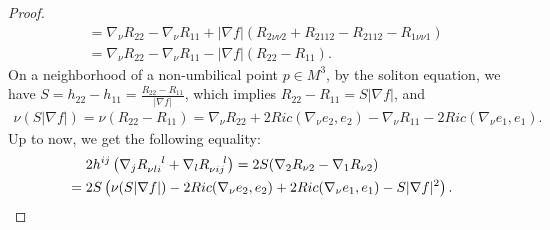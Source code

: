 \documentclass[12pt,a4paper]{amsart}
\begin{document}
\begin{proof}
\begin{align*}
&=\nabla_\nu R_{22}-\nabla_\nu R_{11}+|\nabla f|(R_{2\nu \nu 2}+R_{2112}-R_{2112}-R_{1\nu \nu 1}) \\
&=\nabla_\nu R_{22}-\nabla_\nu R_{11}-|\nabla f|(R_{22}-R_{11}).
\end{align*}
On a neighborhood of a non-umbilical point $p\in M^3$, by the soliton equation, we have $S=h_{22}-h_{11}=\frac{R_{22}-R_{11}}{|\nabla f|}$,
which implies $R_{22}-R_{11}=S|\nabla f|$, and
\begin{align*}
\nu(S|\nabla f|)=\nu(R_{22}-R_{11})
=\nabla_{\nu}R_{22}+2Ric(\nabla_{\nu}e_2,e_2)-\nabla_{\nu}R_{11}-2Ric(\nabla_{\nu}e_1,e_1).
\end{align*}
Up to now, we get the following equality:
\begin{align}
&\quad\ 2h^{ij}\left(\nabla_j R_{\nu li}^{\ \ \ l}+\nabla_l R_{\nu ij}^{\ \ \ l}\right) \notag
=2S(\nabla_2 R_{\nu 2} -\nabla_1R_{\nu 2})\\
&=2S\left(\nu(S|\nabla f|)-2Ric(\nabla_{\nu}e_2,e_2)+2Ric(\nabla_{\nu}e_1,e_1)-S|\nabla f|^2\right). \label{Equation001}
\end{align}


\end{proof}
\end{document}
